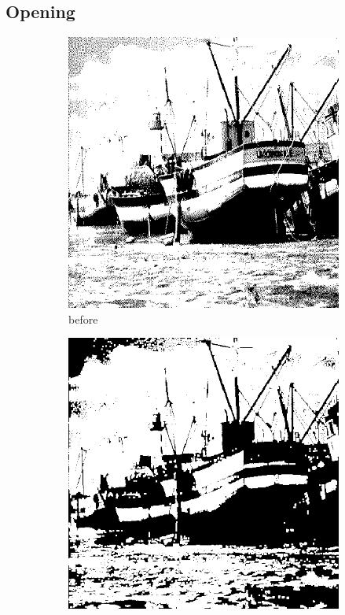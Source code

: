 \documentclass[12pt]{article}
\renewcommand{\subfiguresize}{.25\textwidth}
\begin{document}
\subsection{Opening}
\begin{figure}[H]\centering
    \begin{subfigure}[t]{\subfiguresize}\centering
        \includegraphics[width=\textwidth]{img/magda/boatbw.png}
        \caption{before}
    \end{subfigure}
    \hspace{2em}
    \begin{subfigure}[t]{\subfiguresize}\centering
        \includegraphics[width=\textwidth]{img/magda/output1.png}

\end{subfigure}
\end{figure}
\end{document}
